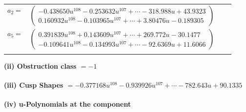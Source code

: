 \documentclass[1p]{elsarticle_modified}
\theoremstyle{definition}
\begin{document}
\begin{tabular}{m{7pt} m{180pt} m{7pt} m{180pt} }
\flushright $a_{2}=$&$\begin{pmatrix}-0.438650 u^{108}-0.253632 u^{107}+\cdots-318.988 u+43.9323\\0.160932 u^{108}-0.103965 u^{107}+\cdots+3.80476 u-0.189305\end{pmatrix}$ \\
\flushright $a_{5}=$&$\begin{pmatrix}0.391839 u^{108}+0.143609 u^{107}+\cdots+269.772 u-30.1477\\-0.109641 u^{108}-0.134993 u^{107}+\cdots-92.6369 u+11.6066\end{pmatrix}$\\&\end{tabular}
\flushleft \textbf{(ii) Obstruction class $= -1$}\\~\\
\flushleft \textbf{(iii) Cusp Shapes $= -0.377168 u^{108}-0.939926 u^{107}+\cdots-782.643 u+90.1335$}\\~\\
\newpage\renewcommand{\arraystretch}{1}
\flushleft \textbf{(iv) u-Polynomials at the component}\newline \\
\end{document}
